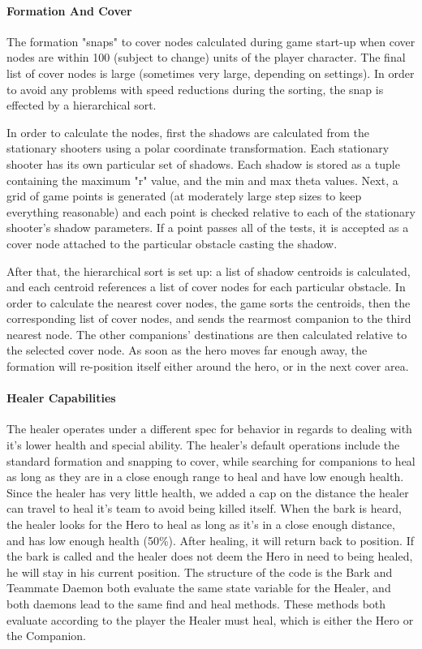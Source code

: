 \documentclass[11pt]{article}
\begin{document}
\paragraph{Formation And Cover}
The formation "snaps" to cover nodes calculated during game start-up when cover nodes are within 100 (subject to change) units of the player character.  The final list of cover nodes is large (sometimes very large, depending on settings).  In order to avoid any problems with speed reductions during the sorting, the snap is effected by a hierarchical sort.  

In order to calculate the nodes, first the shadows are calculated from the stationary shooters using a polar coordinate transformation.  Each stationary shooter has its own particular set of shadows.  Each shadow is stored as a tuple containing the maximum "r" value, and the min and max theta values.  Next, a grid of game points is generated (at moderately large step sizes to keep everything reasonable) and each point is checked relative to each of the stationary shooter's shadow parameters.  If a point passes all of the tests, it is accepted as a cover node attached to the particular obstacle casting the shadow.  

After that, the hierarchical sort is set up: a list of shadow centroids is calculated, and each centroid references a list of cover nodes for each particular obstacle. In order to calculate the nearest cover nodes, the game sorts the centroids, then the corresponding list of cover nodes, and sends the rearmost companion to the third nearest node.  The other companions' destinations are then calculated relative to the selected cover node.  As soon as the hero moves far enough away, the formation will re-position itself either around the hero, or in the next cover area.     

\paragraph{Healer Capabilities}
The healer operates under a different spec for behavior in regards to dealing with it's lower health and special ability. The healer's default operations include the standard formation and snapping to cover, while searching for companions to heal as long as they are in a close enough range to heal and have low enough health. Since the healer has very little health, we added a cap on the distance the healer can travel to heal it's team to avoid being killed itself. When the bark is heard, the healer looks for the Hero to heal as long as it's in a close enough distance, and has low enough health (50\%). After healing, it will return back to position. If the bark is called and the healer does not deem the Hero in need to being healed, he will stay in his current position. The structure of the code is the Bark and Teammate Daemon both evaluate the same state variable for the Healer, and both daemons lead to the same find and heal methods. These methods both evaluate according to the player the Healer must heal, which is either the Hero or the Companion. 
\end{document}
